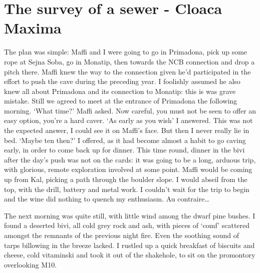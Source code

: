 \section{The survey of a sewer - Cloaca Maxima}

\begin{marginfigure}
\end{marginfigure}
The plan was simple: Maffi and I were going to go in Primadona, pick up some rope at Sejna Soba, go in Monatip, then towards the NCB connection and drop a pitch there. Maffi knew the way to the connection given he’d participated in the effort to push the cave during the preceding year. I foolishly assumed he also knew all about Primadona and its connection to Monatip: this is was grave mistake. Still we agreed to meet at the entrance of Primadona the following morning. 
‘What time?’ Maffi asked. Now careful, you must not be seen to offer an easy option, you’re a hard caver.
‘As early as you wish’ I answered. This was not the expected answer, I could see it on Maffi’s face. But then I never really lie in bed.
‘Maybe ten then?’ I offered, as it had become almost a habit to go caving early, in order to come back up for dinner. This time round, dinner in the bivi after the day’s push was not on the cards: it was going to be a long, arduous trip, with glorious, remote exploration involved at some point. Maffi would be coming up from Kal, picking a path through the boulder slope. I would abseil from the top, with the drill, battery and metal work. I couldn’t wait for the trip to begin and the wine did nothing to quench my enthusiasm. Au contraire…

The next morning was quite still, with little wind among the dwarf pine bushes. I found a deserted bivi, all cold grey rock and ash, with pieces of ‘comf’ scattered amongst the remnants of the previous night fire. Even the soothing sound of tarps billowing in the breeze lacked. I rustled up a quick breakfast of biscuits and cheese, cold vitaminski and took it out of the shakehole, to sit on the promontory overlooking M10. 

